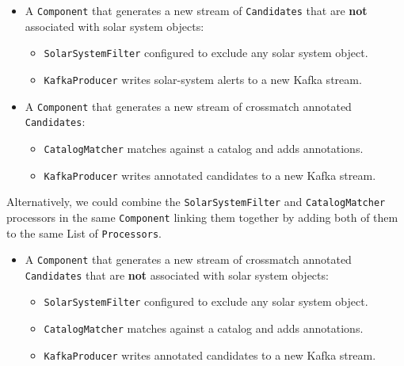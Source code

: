 \documentclass{article}
\newcommand{\crossmatch} {crossmatch\xspace}
\begin{document}
\begin{itemize}
    \item A \texttt{Component} that generates a new stream of \texttt{Candidates} that are \textbf{not} associated with solar system objects:
    \begin{itemize}
        \item \texttt{SolarSystemFilter} configured to exclude any solar system object.
    \end{itemize}
    \begin{itemize}
        \item \texttt{KafkaProducer} writes solar-system alerts to a new Kafka stream.
    \end{itemize}
\end{itemize}

\begin{itemize}
    \item A \texttt{Component} that generates a new stream of \crossmatch annotated \texttt{Candidates}:
    \begin{itemize}
        \item \texttt{CatalogMatcher} matches against a catalog and adds annotations.
    \end{itemize}
    \begin{itemize}
        \item \texttt{KafkaProducer} writes annotated candidates to a new Kafka stream.
    \end{itemize}
\end{itemize}

Alternatively, we could combine the \texttt{SolarSystemFilter} and \texttt{CatalogMatcher} processors in the same \texttt{Component} linking them together by adding both of them to the same List of \texttt{Processors}.

\begin{itemize}
    \item A \texttt{Component} that generates a new stream of \crossmatch annotated \texttt{Candidates} that are \textbf{not} associated with solar system objects:
    \begin{itemize}
        \item \texttt{SolarSystemFilter} configured to exclude any solar system object.
    \end{itemize}
    \begin{itemize}
        \item \texttt{CatalogMatcher} matches against a catalog and adds annotations.
    \end{itemize}
    \begin{itemize}
        \item \texttt{KafkaProducer} writes annotated candidates to a new Kafka stream.
    \end{itemize}
\end{itemize}
\end{document}
